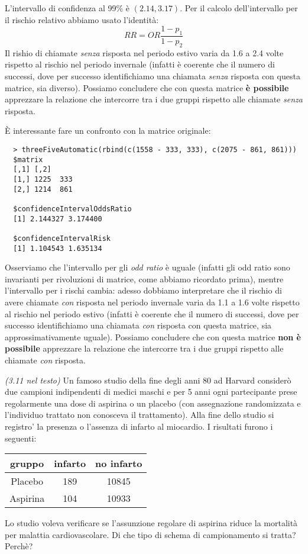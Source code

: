 L'intervallo di confidenza al 99\% \`e $(2.14, 3.17)$. Per il calcolo
dell'intervallo per il rischio relativo abbiamo usato l'identit\`a:
\begin{displaymath}
  RR = OR\frac{1-p_1}{1-p_2}
\end{displaymath}
Il rishio di chiamate \emph{senza} risposta nel periodo estivo varia
da 1.6 a 2.4 volte rispetto al rischio nel periodo invernale (infatti
\`e coerente che il numero di successi, dove per successo
identifichiamo una chiamata \emph{senza} risposta con questa matrice,
sia diverso). Possiamo concludere che con questa matrice \textbf{\`e
  possibile} apprezzare la relazione che intercorre tra i due gruppi
rispetto alle chiamate \emph{senza} risposta.

\`E interessante fare un confronto con la matrice originale:
\begin{lstlisting}
  > threeFiveAutomatic(rbind(c(1558 - 333, 333), c(2075 - 861, 861)))
  $matrix
  [,1] [,2]
  [1,] 1225  333
  [2,] 1214  861

  $confidenceIntervalOddsRatio
  [1] 2.144327 3.174400

  $confidenceIntervalRisk
  [1] 1.104543 1.635134 
\end{lstlisting}
Osserviamo che l'intervallo per gli \emph{odd ratio} \`e uguale
(infatti gli odd ratio sono invarianti per rivoluzioni di matrice,
come abbiamo ricordato prima), mentre l'intervallo per i rischi
cambia: adesso dobbiamo interpretare che il rischio di avere chiamate
\emph{con} risposta nel periodo invernale varia da 1.1 a 1.6 volte
rispetto al rischio nel periodo estivo (infatti \`e coerente che il
numero di successi, dove per successo identifichiamo una chiamata
\emph{con} risposta con questa matrice, sia approssimativamente
uguale). Possiamo concludere che con questa matrice \textbf{non \`e
  possibile} apprezzare la relazione che intercorre tra i due gruppi
rispetto alle chiamate \emph{con} risposta.

\begin{exercise}{\emph{(3.11 nel testo)}}
  Un famoso studio della fine degli anni 80 ad Harvard consider\`o due
  campioni indipendenti di medici maschi e per 5 anni ogni
  partecipante prese regolarmente una dose di aspirina o un placebo
  (con assegnazione randomizzata e l'individuo trattato non conosceva
  il trattamento). Alla fine dello studio si registro' la presenza o
  l'assenza di infarto al miocardio. I risultati furono i seguenti:
  \begin{table}[h]              %
    \centering
    \begin{tabular}{|c|c|c|}
      \hline
      gruppo & infarto & no infarto \\\hline
      Placebo & 189 & 10845 \\
      Aspirina & 104 & 10933  \\ \hline
    \end{tabular}
  \end{table}
  Lo studio voleva verificare se l'assunzione regolare di aspirina
  riduce la mortalit\`a per malattia cardiovascolare. Di che tipo di
  schema di campionamento si tratta?  Perch\`e?
\end{exercise}

